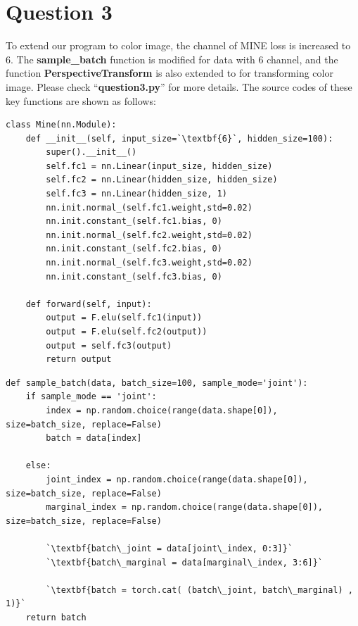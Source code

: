 \documentclass[UTF8]{article}
\begin{document}
\section*{Question 3}
\label{sec_q3}
To extend our program to color image,
the channel of MINE loss is increased to 6.
The \textbf{sample\_batch} function is modified for data with 6 channel,
and the function \textbf{PerspectiveTransform} is also extended to for transforming color image.
Please check ``\textbf{question3.py}'' for more details.
The source codes of these key functions are shown as follows:
\begin{lstlisting}
class Mine(nn.Module):
    def __init__(self, input_size=`\textbf{6}`, hidden_size=100):
        super().__init__()
        self.fc1 = nn.Linear(input_size, hidden_size)
        self.fc2 = nn.Linear(hidden_size, hidden_size)
        self.fc3 = nn.Linear(hidden_size, 1)
        nn.init.normal_(self.fc1.weight,std=0.02)
        nn.init.constant_(self.fc1.bias, 0)
        nn.init.normal_(self.fc2.weight,std=0.02)
        nn.init.constant_(self.fc2.bias, 0)
        nn.init.normal_(self.fc3.weight,std=0.02)
        nn.init.constant_(self.fc3.bias, 0)

    def forward(self, input):
        output = F.elu(self.fc1(input))
        output = F.elu(self.fc2(output))
        output = self.fc3(output)
        return output

\end{lstlisting}

\begin{lstlisting}
def sample_batch(data, batch_size=100, sample_mode='joint'):
    if sample_mode == 'joint':
        index = np.random.choice(range(data.shape[0]), size=batch_size, replace=False)
        batch = data[index]

    else:
        joint_index = np.random.choice(range(data.shape[0]), size=batch_size, replace=False)
        marginal_index = np.random.choice(range(data.shape[0]), size=batch_size, replace=False)

        `\textbf{batch\_joint = data[joint\_index, 0:3]}`
        `\textbf{batch\_marginal = data[marginal\_index, 3:6]}`

        `\textbf{batch = torch.cat( (batch\_joint, batch\_marginal) , 1)}`
    return batch
\end{lstlisting}
\end{document}
